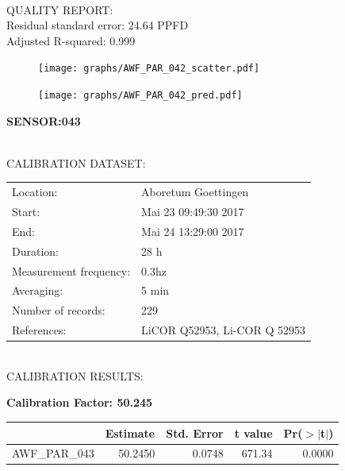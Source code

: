 \documentclass[oneside]{report}
\begin{document}
\hrulefill\\
QUALITY REPORT:\\
Residual standard error: 24.64 PPFD\\
Adjusted R-squared: 0.999



\begin{figure}[H]
  \centering
  \texttt{[image: graphs/AWF\_PAR\_042\_scatter.pdf]}
\end{figure}




\begin{figure}[H]
  \centering
  \texttt{[image: graphs/AWF\_PAR\_042\_pred.pdf]}
\end{figure}

\pagebreak


\begin{center}
\large{\textbf{SENSOR:043}}\\
\end{center}

\hrulefill\\
CALIBRATION DATASET:\\
\begin{table}[h!]
  \centering
  \label{tab:table1}
  \begin{tabular}{ll}
    Location: & Aboretum Goettingen\\ 
    
    
    Start:  & Mai 23 09:49:30 2017 \\
    End:   & Mai 24 13:29:00 2017\\ 
    Duration: & 28 h\\
    Measurement frequency: & 0.3hz\\
    Averaging:  &5 min\\
    Number of records: & 229 \\
    References: & LiCOR Q52953, Li-COR Q 52953 \\
  \end{tabular}
\end{table}

\hrulefill\\
CALIBRATION RESULTS:\\


\begin{center}
\textbf{\large{Calibration Factor: 50.245}}\\
\end{center}
\begin{table}[ht]
\centering
\begin{tabular}{rrrrr}
  \hline
 & Estimate & Std. Error & t value & Pr($>$$|$t$|$) \\ 
  \hline
AWF\_PAR\_043 & 50.2450 & 0.0748 & 671.34 & 0.0000 \\ 
   \hline
\end{tabular}
\end{table}
\end{document}
